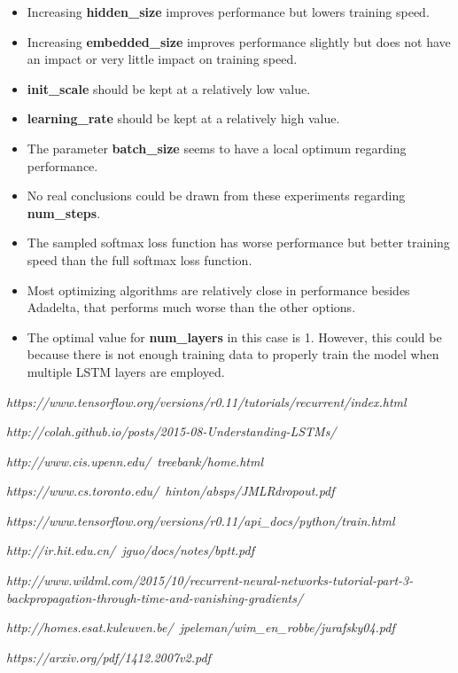 \documentclass[10pt,a4paper,titlepage]{article}
\begin{document}
\begin{itemize}
	\item Increasing \textbf{hidden\_size} improves performance but lowers training speed.
	\item Increasing \textbf{embedded\_size} improves performance slightly but does not have an impact or very little impact on training speed.
	\item \textbf{init\_scale} should be kept at a relatively low value.	
	\item \textbf{learning\_rate} should be kept at a relatively high value.
	\item The parameter \textbf{batch\_size} seems to have a local optimum regarding performance.
	\item No real conclusions could be drawn from these experiments regarding \textbf{num\_steps}. 
	\item The sampled softmax loss function has worse performance but better training speed than the full softmax loss function. 
	\item Most optimizing algorithms are relatively close in performance besides Adadelta, that performs much worse than the other options.
	\item The optimal value for \textbf{num\_layers} in this case is 1. However, this could be because there is not enough training data to properly train the model when multiple LSTM layers are employed.
\end{itemize}


\newpage
{}
\begin{thebibliography}{9}
	
	\textit{https://www.tensorflow.org/versions/r0.11/tutorials/recurrent/index.html}
	
	\textit{http://colah.github.io/posts/2015-08-Understanding-LSTMs/}
	
	\textit{http://www.cis.upenn.edu/~treebank/home.html}
	
	\textit{https://www.cs.toronto.edu/~hinton/absps/JMLRdropout.pdf}
	
	\textit{https://www.tensorflow.org/versions/r0.11/api\_docs/python/train.html}
	
	\textit{http://ir.hit.edu.cn/~jguo/docs/notes/bptt.pdf}
	
	\textit{http://www.wildml.com/2015/10/recurrent-neural-networks-tutorial-part-3-backpropagation-through-time-and-vanishing-gradients/}
	
	\textit{http://homes.esat.kuleuven.be/~jpeleman/wim\_en\_robbe/jurafsky04.pdf}
	
	\textit{https://arxiv.org/pdf/1412.2007v2.pdf}
	
\end{thebibliography}
	
\end{document}
